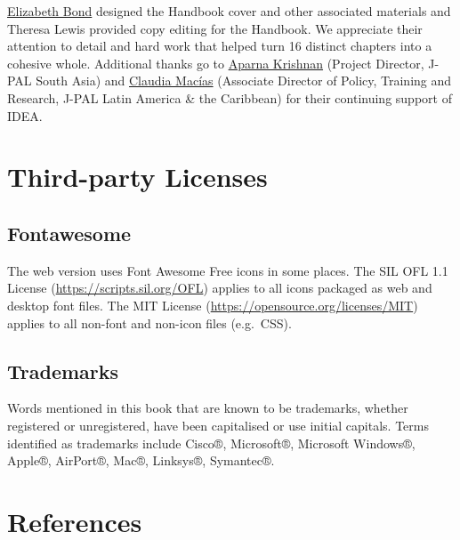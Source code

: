 \documentclass[
]{WileySix}
\begin{document}
\href{https://www.povertyactionlab.org/person/bond}{Elizabeth Bond} designed the Handbook cover and other associated materials and Theresa Lewis provided copy editing for the Handbook. We appreciate their attention to detail and hard work that helped turn 16 distinct chapters into a cohesive whole. Additional thanks go to \href{https://www.povertyactionlab.org/person/krishnan}{Aparna Krishnan} (Project Director, J-PAL South Asia) and \href{https://www.povertyactionlab.org/person/macias}{Claudia Macías} (Associate Director of Policy, Training and Research, J-PAL Latin America \& the Caribbean) for their continuing support of IDEA.

\hypertarget{third-party-licenses}{%
\section*{Third-party Licenses}\label{third-party-licenses}}

\hypertarget{fontawesome}{%
\subsection*{Fontawesome}\label{fontawesome}}

The web version uses Font Awesome Free icons in some places.
The SIL OFL 1.1 License (\url{https://scripts.sil.org/OFL}) applies to all icons
packaged as web and desktop font files. The MIT License (\url{https://opensource.org/licenses/MIT}) applies to all non-font and
non-icon files (e.g.~CSS).

\hypertarget{trademarks}{%
\subsection*{Trademarks}\label{trademarks}}

Words mentioned in this book that are known to be trademarks, whether
registered or unregistered, have been capitalised or use initial
capitals. Terms identified as trademarks include Cisco®, Microsoft®,
Microsoft Windows®, Apple®, AirPort®, Mac®, Linksys®, Symantec®.

\hypertarget{references}{%
\section*{References}\label{references}}

  
\end{document}
